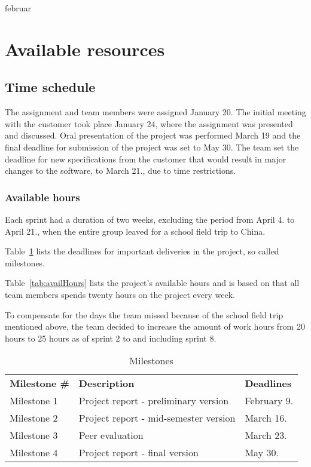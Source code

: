 februar\section{Available resources}
\subsection{Time schedule}
The assignment and team members were assigned January 20. The initial meeting with the customer took place January 24, where the assignment was presented and discussed. Oral presentation of the project was performed March 19 and the final deadline for submission of the project was set to May 30. The team set the deadline for new specifications from the customer that would result in major changes to the software, to March 21., due to time restrictions.

\subsubsection{Available hours}
Each sprint had a duration of two weeks, excluding the period from April 4. to April 21., when the entire group leaved for a school field trip to China.

Table~\ref{tab:milestones} lists the deadlines for important deliveries in the project, so called milestones.

Table~\ref{tab:availHours} lists the project's available hours and is based on that all team members spends twenty hours on the project every week.

To compensate for the days the team missed because of the school field trip mentioned above, the team decided to increase the amount of work hours from 20 hours to 25 hours as of sprint 2 to and including sprint 8.

\begin{table}[H]
\centering
{}
\begin{tabular}{|l|l|l|}
\hline
\textbf{Milestone \#} & \textbf{Description} & \textbf{Deadlines}\\
Milestone 1& Project report - preliminary version & February 9. \\
Milestone 2 & Project report - mid-semester version & March 16.  \\
Milestone 3 & Peer evaluation & March 23.  \\
 Milestone 4 & Project report - final version & May 30.\\\hline
\end{tabular}
\caption{Milestones}
\label{tab:milestones}
\end{table}

